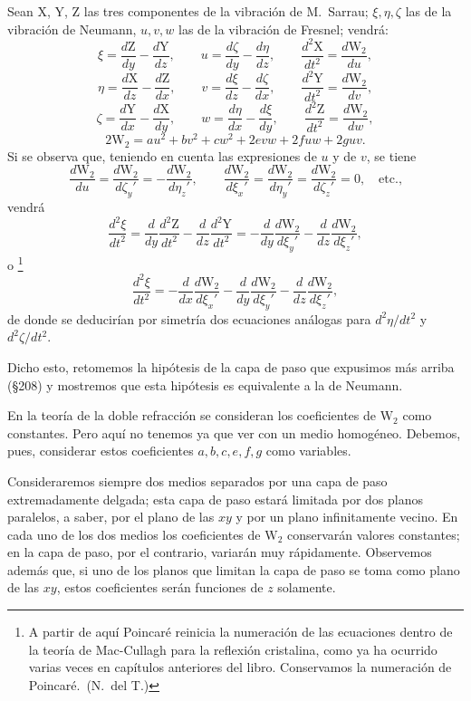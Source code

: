 Sean X, Y, Z las tres componentes de la vibración de M.~Sarrau; $\xi,\eta,\zeta$
las de la vibración de Neumann, $u,v,w$ las de la vibración de Fresnel;
vendrá:
\[
\xi=\frac{d\mathrm{Z}}{dy}-\frac{d\mathrm{Y}}{dz},\qquad
u=\frac{d\zeta}{dy}-\frac{d\eta}{dz},\qquad
\frac{d^2\mathrm{X}}{dt^2}=\frac{d\mathrm{W}_2}{du},
\]
\[
\eta=\frac{d\mathrm{X}}{dz}-\frac{d\mathrm{Z}}{dx},\qquad
v=\frac{d\xi}{dz}-\frac{d\zeta}{dx},\qquad
\frac{d^2\mathrm{Y}}{dt^2}=\frac{d\mathrm{W}_2}{dv},
\]
\[
\zeta=\frac{d\mathrm{Y}}{dx}-\frac{d\mathrm{X}}{dy},\qquad
w=\frac{d\eta}{dx}-\frac{d\xi}{dy},\qquad
\frac{d^2\mathrm{Z}}{dt^2}=\frac{d\mathrm{W}_2}{dw},
\]
\[
2\mathrm{W}_2=au^2+bv^2+cw^2+2evw+2fuw+2guv.
\]
Si se observa que, teniendo en cuenta las expresiones de $u$ y de $v$, se
tiene
\[
\frac{d\mathrm{W}_2}{du}=\frac{d\mathrm{W}_2}{d\zeta_y'}=-\frac{d\mathrm{W}_2}{d\eta_z'},\qquad
\frac{d\mathrm{W}_2}{d\xi_x'}=\frac{d\mathrm{W}_2}{d\eta_y'}=\frac{d\mathrm{W}_2}{d\zeta_z'}=0,\quad\text{etc.,}
\]
vendrá
\[
\frac{d^2\xi}{dt^2}=\frac{d}{dy}\frac{d^2\mathrm{Z}}{dt^2}
-\frac{d}{dz}\frac{d^2\mathrm{Y}}{dt^2}
=-\frac{d}{dy}\frac{d\mathrm{W}_2}{d\xi_y'}-\frac{d}{dz}\frac{d\mathrm{W}_2}{d\xi_z'},
\]
o
\footnote{A partir de aquí Poincaré reinicia la numeración de las
ecuaciones dentro de la teoría de Mac-Cullagh para la reflexión
cristalina, como ya ha ocurrido varias veces en capítulos anteriores del
libro. Conservamos la numeración de Poincaré.~(N.~del T.)}
\setcounter{equation}{0}
\begin{equation}
\frac{d^2\xi}{dt^2}=-\frac{d}{dx}\frac{d\mathrm{W}_2}{d\xi_x'}
-\frac{d}{dy}\frac{d\mathrm{W}_2}{d\xi_y'}-\frac{d}{dz}\frac{d\mathrm{W}_2}{d\xi_z'},
\end{equation}
de donde se deducirían por simetría dos ecuaciones análogas para
$d^2\eta/dt^2$ y $d^2\zeta/dt^2$.

Dicho esto, retomemos la hipótesis de la capa de paso que expusimos más
arriba (§208) y mostremos que esta hipótesis es equivalente a la de
Neumann.

En la teoría de la doble refracción se consideran los coeficientes de
$\mathrm{W}_2$ como constantes. Pero aquí no tenemos ya que ver con un medio
homogéneo. Debemos, pues, considerar estos coeficientes $a,b,c,e,f,g$
como variables.

Consideraremos siempre dos
medios separados por una capa de paso extremadamente delgada; esta capa de
paso estará limitada por dos planos paralelos, a saber, por el plano de
las $xy$ y por un plano infinitamente vecino. En cada uno de los dos
medios los coeficientes de $\mathrm{W}_2$ conservarán valores constantes; en la
capa de paso, por el contrario, variarán muy rápidamente. Observemos
además que, si uno de los planos que limitan la capa de paso se toma
como plano de las $xy$, estos coeficientes serán funciones de $z$
solamente.


